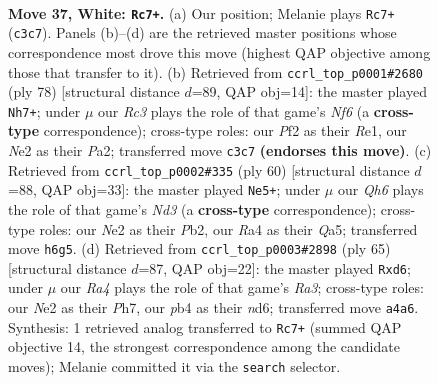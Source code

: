 \documentclass[11pt]{article}
\begin{document}
\clearpage

\begin{figure}[p]\centering
\begin{subfigure}{0.46\textwidth}\centering
\resizebox{\linewidth}{!}{%
\newchessgame
\chessboard[
  setfen={1rn5/5k2/p2p2pQ/3qr2p/Rp2p2P/2R5/4NPP1/5K2 w - - 0 37},
  showmover=false,
  pgfstyle=straightmove, color=movearrow, markmove={c3-c7}
]}
\caption{}
\end{subfigure}\hfill
\begin{subfigure}{0.46\textwidth}\centering
\resizebox{\linewidth}{!}{%
\newchessgame
\chessboard[
  setfen={5k2/p3r1p1/qpnp1N1p/5p1Q/7P/2P3PK/P7/4R3 w - - 2 40},
  showmover=false,
  pgfstyle=straightmove, color=movearrow, markmove={f6-h7}
]}
\caption{}
\end{subfigure}
\\[4pt]
\begin{subfigure}{0.46\textwidth}\centering
\resizebox{\linewidth}{!}{%
\newchessgame
\chessboard[
  setfen={1n6/p2rqkpp/2pRp3/Q4p2/2P2P2/3N4/1P4PP/6K1 w - - 0 31},
  showmover=false,
  pgfstyle=straightmove, color=movearrow, markmove={d3-e5}
]}
\caption{}
\end{subfigure}\hfill
\begin{subfigure}{0.46\textwidth}\centering
\resizebox{\linewidth}{!}{%
\newchessgame
\chessboard[
  setfen={4r1k1/5ppp/r2N4/3P1P2/8/2q5/P4QPP/1R3R1K b - - 0 33},
  showmover=false,
  pgfstyle=straightmove, color=movearrow, markmove={a6-d6}
]}
\caption{}
\end{subfigure}
\caption{\textbf{Move 37, White: \texttt{Rc7+}.} (a) Our position; Melanie plays \texttt{Rc7+} (\texttt{c3c7}). Panels (b)--(d) are the retrieved master positions whose correspondence most drove this move (highest QAP objective among those that transfer to it). (b) Retrieved from \texttt{ccrl\_top\_p0001\#2680} (ply 78) [structural distance $d$=89, QAP obj=14]: the master played \texttt{Nh7+}; under $\mu$ our \emph{Rc3} plays the role of that game's \emph{Nf6} (a \textbf{cross-type} correspondence); cross-type roles: our \emph{P}f2 as their \emph{R}e1, our \emph{N}e2 as their \emph{P}a2; transferred move \texttt{c3c7} \textbf{(endorses this move)}. (c) Retrieved from \texttt{ccrl\_top\_p0002\#335} (ply 60) [structural distance $d$=88, QAP obj=33]: the master played \texttt{Ne5+}; under $\mu$ our \emph{Qh6} plays the role of that game's \emph{Nd3} (a \textbf{cross-type} correspondence); cross-type roles: our \emph{N}e2 as their \emph{P}b2, our \emph{R}a4 as their \emph{Q}a5; transferred move \texttt{h6g5}. (d) Retrieved from \texttt{ccrl\_top\_p0003\#2898} (ply 65) [structural distance $d$=87, QAP obj=22]: the master played \texttt{Rxd6}; under $\mu$ our \emph{Ra4} plays the role of that game's \emph{Ra3}; cross-type roles: our \emph{N}e2 as their \emph{P}h7, our \emph{p}b4 as their \emph{n}d6; transferred move \texttt{a4a6}. Synthesis: 1 retrieved analog transferred to \texttt{Rc7+} (summed QAP objective 14, the strongest correspondence among the candidate moves); Melanie committed it via the \texttt{search} selector.}
\label{fig:thought-m72}
\end{figure}
\end{document}
